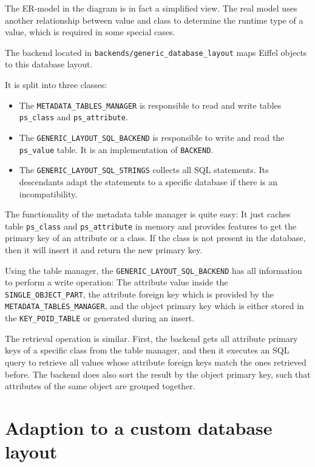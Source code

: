\documentclass[a4paper,12pt]{report}
\begin{document}
The ER-model in the diagram is in fact a simplified view. 
The real model uses another relationship between value and class to determine the runtime type of a value, which is required in some special cases.

The backend located in \lstinline!backends/generic_database_layout! maps Eiffel objects to this database layout.

It is split into three classes:
\begin{itemize}
 \item The \lstinline!METADATA_TABLES_MANAGER! is responsible to read and write tables \lstinline!ps_class! and \lstinline!ps_attribute!.
 \item The \lstinline!GENERIC_LAYOUT_SQL_BACKEND! is responsible to write and read the \lstinline!ps_value! table. It is an implementation of \lstinline!BACKEND!.
 \item The \lstinline!GENERIC_LAYOUT_SQL_STRINGS! collects all SQL statements. Its descendants adapt the statements to a specific database if there is an incompatibility.
\end{itemize}

The functionality of the metadata table manager is quite easy:
It just caches table \lstinline!ps_class! and \lstinline!ps_attribute! in memory and provides features to get the primary key of an attribute or a class.
If the class is not present in the database, then it will insert it and return the new primary key.

Using the table manager, the \lstinline!GENERIC_LAYOUT_SQL_BACKEND! has all information to perform a write operation:
The attribute value inside the \lstinline!SINGLE_OBJECT_PART!, the attribute foreign key which is provided by the \lstinline!METADATA_TABLES_MANAGER!, 
and the object primary key which is either stored in the \lstinline!KEY_POID_TABLE! or generated during an insert.

The retrieval operation is similar.
First, the backend gets all attribute primary keys of a specific class from the table manager, and then it executes an SQL query to retrieve all values whose attribute foreign keys match the ones retrieved before.
The backend does also sort the result by the object primary key, such that attributes of the same object are grouped together.


\section{Adaption to a custom database layout}
\label{subsection:specific_adaption}
\end{document}
